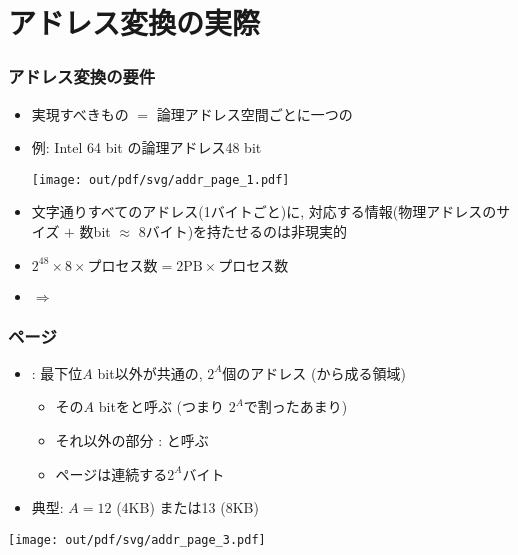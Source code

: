 \documentclass[12pt,dvipdfmx]{beamer}
\begin{document}
\section{アドレス変換の実際}

\begin{frame}
  \frametitle{アドレス変換の要件}
  \begin{itemize}
  \item 実現すべきもの $=$ 論理アドレス空間ごとに一つの

    \begin{center}
    \end{center}
    
  \item 例: Intel 64 bit の論理アドレス48 bit
    
    \begin{center}
      \texttt{[image: out/pdf/svg/addr\_page\_1.pdf]}
    \end{center}
    
  \item 文字通りすべてのアドレス(1バイトごと)に,
    対応する情報(物理アドレスのサイズ $+$ 数bit
    $\approx$ 8バイト)を持たせるのは非現実的
  \item $2^{48} \times 8 \times \mbox{プロセス数}
    = 2\mbox{PB} \times \mbox{プロセス数}$
  \item $\Rightarrow$ 
  \end{itemize}
\end{frame}

\begin{frame}
  \frametitle{ページ}
  \begin{itemize}
  \item {} : 最下位$A$ bit以外が共通の, $2^A$個のアドレス
    (から成る領域)
    \begin{itemize}
    \item その$A$ bitをと呼ぶ
      (つまり $2^A$で割ったあまり)
    \item それ以外の部分 : と呼ぶ
    \item ページは連続する$2^{A}$バイト
    \end{itemize}
  \item 典型: $A = 12$ (4KB) または13 (8KB)
  \end{itemize}

  \begin{center}
    \texttt{[image: out/pdf/svg/addr\_page\_3.pdf]}
  \end{center}
\end{frame}
\end{document}
